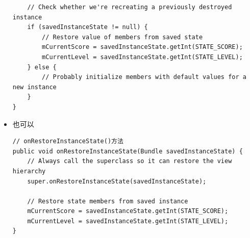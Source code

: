 \documentclass[9pt, b5paper]{article}
\begin{document}
\begin{itemize}
\begin{verbatim}
    // Check whether we're recreating a previously destroyed instance
    if (savedInstanceState != null) {
        // Restore value of members from saved state
        mCurrentScore = savedInstanceState.getInt(STATE_SCORE);
        mCurrentLevel = savedInstanceState.getInt(STATE_LEVEL);
    } else {
        // Probably initialize members with default values for a new instance
    }
}
\end{verbatim}
\item 也可以
\begin{verbatim}
// onRestoreInstanceState()方法
public void onRestoreInstanceState(Bundle savedInstanceState) {
    // Always call the superclass so it can restore the view hierarchy
    super.onRestoreInstanceState(savedInstanceState);
   
    // Restore state members from saved instance
    mCurrentScore = savedInstanceState.getInt(STATE_SCORE);
    mCurrentLevel = savedInstanceState.getInt(STATE_LEVEL);
}
\end{verbatim}
\end{itemize}
\end{document}

